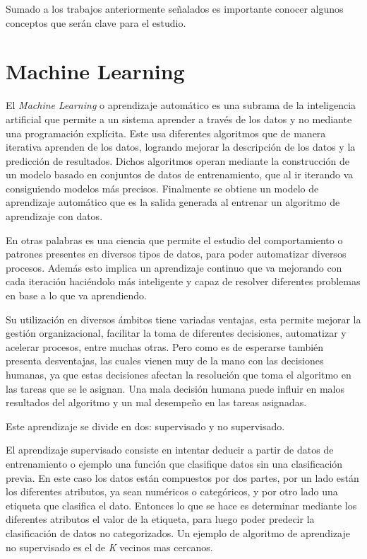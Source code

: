 Sumado a los trabajos anteriormente señalados es importante conocer algunos conceptos que serán clave para el estudio.

\section{Machine Learning}

El \textit{Machine Learning} \cite{IBMML} o aprendizaje automático es una subrama de la inteligencia artificial que permite a un sistema aprender a través de los datos y no mediante una programación explícita. Este usa diferentes algoritmos que de manera iterativa aprenden de los datos, logrando mejorar la descripción de los datos y la predicción de resultados. Dichos algoritmos operan mediante la construcción de un modelo basado en conjuntos de datos de entrenamiento, que al ir iterando va consiguiendo modelos más precisos. Finalmente se obtiene un modelo de aprendizaje automático que es la salida generada al entrenar un algoritmo de aprendizaje con datos.

En otras palabras es una ciencia que permite el estudio del comportamiento o patrones presentes en diversos tipos de datos, para poder automatizar diversos procesos. Además esto implica un aprendizaje continuo que va mejorando con cada iteración haciéndolo más inteligente y capaz de resolver diferentes problemas en base a lo que va aprendiendo.

Su utilización en diversos ámbitos tiene variadas ventajas, esta permite mejorar la gestión organizacional, facilitar la toma de diferentes decisiones, automatizar y acelerar procesos, entre muchas otras. Pero como es de esperarse también presenta desventajas, las cuales vienen muy de la mano con las decisiones humanas, ya que estas decisiones afectan la resolución que toma el algoritmo en las tareas que se le asignan. Una mala decisión humana puede influir en malos resultados del algoritmo y un mal desempeño en las tareas asignadas.

Este aprendizaje se divide en dos: supervisado y no supervisado.

El aprendizaje supervisado consiste en intentar deducir a partir de datos de entrenamiento o ejemplo una función que clasifique datos sin una clasificación previa. En este caso los datos están compuestos por dos partes, por un lado están los diferentes atributos, ya sean numéricos o categóricos, y por otro lado una etiqueta que clasifica el dato. Entonces lo que se hace es determinar mediante los diferentes atributos el valor de la etiqueta, para luego poder predecir la clasificación de datos no categorizados. Un ejemplo de algoritmo de aprendizaje no supervisado es el de \textit{K} vecinos mas cercanos.

